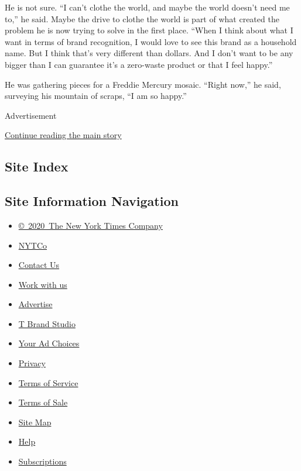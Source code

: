 He is not sure. ``I can't clothe the world, and maybe the world doesn't
need me to,'' he said. Maybe the drive to clothe the world is part of
what created the problem he is now trying to solve in the first place.
``When I think about what I want in terms of brand recognition, I would
love to see this brand as a household name. But I think that's very
different than dollars. And I don't want to be any bigger than I can
guarantee it's a zero-waste product or that I feel happy.''

He was gathering pieces for a Freddie Mercury mosaic. ``Right now,'' he
said, surveying his mountain of scraps, ``I am so happy.''

Advertisement

\protect\hyperlink{after-bottom}{Continue reading the main story}

\hypertarget{site-index}{%
\subsection{Site Index}\label{site-index}}

\hypertarget{site-information-navigation}{%
\subsection{Site Information
Navigation}\label{site-information-navigation}}

\begin{itemize}
\tightlist
\item
  \href{https://help.nytimes3xbfgragh.onion/hc/en-us/articles/115014792127-Copyright-notice}{©~2020~The
  New York Times Company}
\end{itemize}

\begin{itemize}
\tightlist
\item
  \href{https://www.nytco.com/}{NYTCo}
\item
  \href{https://help.nytimes3xbfgragh.onion/hc/en-us/articles/115015385887-Contact-Us}{Contact
  Us}
\item
  \href{https://www.nytco.com/careers/}{Work with us}
\item
  \href{https://nytmediakit.com/}{Advertise}
\item
  \href{http://www.tbrandstudio.com/}{T Brand Studio}
\item
  \href{https://www.nytimes3xbfgragh.onion/privacy/cookie-policy\#how-do-i-manage-trackers}{Your
  Ad Choices}
\item
  \href{https://www.nytimes3xbfgragh.onion/privacy}{Privacy}
\item
  \href{https://help.nytimes3xbfgragh.onion/hc/en-us/articles/115014893428-Terms-of-service}{Terms
  of Service}
\item
  \href{https://help.nytimes3xbfgragh.onion/hc/en-us/articles/115014893968-Terms-of-sale}{Terms
  of Sale}
\item
  \href{https://spiderbites.nytimes3xbfgragh.onion}{Site Map}
\item
  \href{https://help.nytimes3xbfgragh.onion/hc/en-us}{Help}
\item
  \href{https://www.nytimes3xbfgragh.onion/subscription?campaignId=37WXW}{Subscriptions}
\end{itemize}
